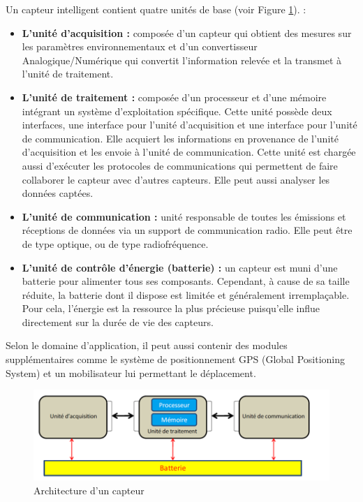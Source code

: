  Un capteur intelligent contient quatre unités de base (voir Figure \ref{archiCapteur}). :
 \begin{itemize}

\item \textbf{L'unité d’acquisition :} composée d’un capteur qui obtient des mesures sur les paramètres environnementaux et d’un convertisseur Analogique/Numérique qui convertit l’information relevée et la transmet à l’unité de traitement.

\item \textbf{L'unité de traitement :} composée d’un processeur et d’une mémoire intégrant un système d’exploitation spécifique. Cette unité possède deux interfaces, une interface pour l’unité d’acquisition et une interface pour l’unité de communication. Elle acquiert les informations en provenance de l’unité d’acquisition et les envoie à l’unité de communication. Cette unité est chargée aussi d’exécuter les protocoles de communications qui permettent de faire collaborer le capteur avec d’autres capteurs. Elle peut aussi analyser les données captées.

\item \textbf{L'unité de communication : } unité responsable de toutes les émissions et réceptions de données via un support de communication radio. Elle peut être de type optique, ou de type radiofréquence.

\item \textbf{L'unité de contrôle d'énergie (batterie) :} un capteur est muni d’une batterie pour alimenter tous ses composants. Cependant, à cause de sa taille réduite, la batterie dont il dispose est limitée et généralement irremplaçable. Pour cela, l’énergie est la ressource la plus précieuse puisqu’elle influe directement sur la durée de vie des capteurs.

\end{itemize}

Selon le domaine d'application, il peut aussi contenir des modules supplémentaires comme le système de positionnement GPS (Global Positioning System) et un mobilisateur lui permettant le déplacement.

\begin{figure}[h]
\centering
\includegraphics[scale=0.8]{intro/archiCapteur}
\caption{\label{archiCapteur} Architecture d’un capteur}
\end{figure}


